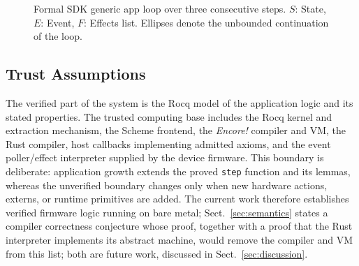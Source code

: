 \documentclass[runningheads]{llncs}
\newcommand{\encore}{\textit{Encore!}}
\newcommand{\code}[1]{\texttt{#1}}
\begin{document}
\begin{figure}
\centering
{}
\caption{Formal SDK generic app loop over three consecutive steps. $S$: State, $E$: Event, $F$: Effects list. Ellipses denote the unbounded continuation of the loop.}
\label{fig:funloop}
\end{figure}

\subsection{Trust Assumptions}
\label{sec:trust}

The verified part of the system is the Rocq model of the application logic and its stated properties.
The trusted computing base includes the Rocq kernel and extraction mechanism, the Scheme frontend, the \encore{} compiler and VM, the Rust compiler, host callbacks implementing admitted axioms, and the event poller/effect interpreter supplied by the device firmware.
This boundary is deliberate: application growth extends the proved \code{step} function and its lemmas, whereas the unverified boundary changes only when new hardware actions, externs, or runtime primitives are added.
The current work therefore establishes verified firmware logic running on bare metal; Sect.~\ref{sec:semantics} states a compiler correctness conjecture whose proof, together with a proof that the Rust interpreter implements its abstract machine, would remove the compiler and VM from this list; both are future work, discussed in Sect.~\ref{sec:discussion}.
\end{document}
